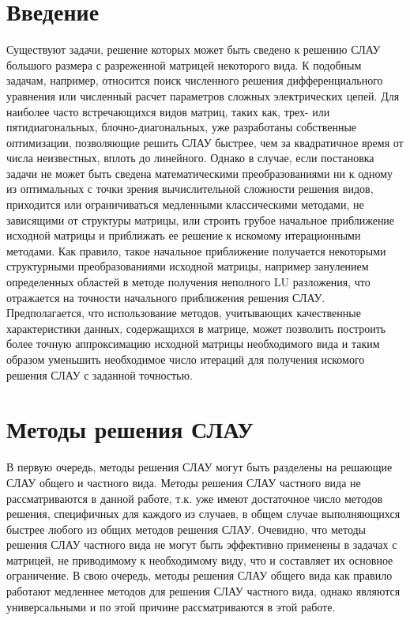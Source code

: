 
\renewcommand{\clearpage}{}


\section{Введение}
Существуют задачи, решение которых может быть сведено к решению СЛАУ большого размера с разреженной матрицей некоторого вида. К подобным задачам, например, относится поиск численного решения дифференциального уравнения или численный расчет параметров сложных электрических цепей. Для наиболее часто встречающихся видов матриц, таких как, трех- или пятидиагональных, блочно-диагональных, уже разработаны собственные оптимизации, позволяющие решить СЛАУ быстрее, чем за квадратичное время от числа неизвестных, вплоть до линейного. Однако в случае, если постановка задачи не может быть сведена математическими преобразованиями ни к одному из оптимальных с точки зрения вычислительной сложности решения видов, приходится или ограничиваться медленными классическими методами, не зависящими от структуры матрицы, или строить грубое начальное приближение исходной матрицы и приближать ее решение к искомому итерационными методами. Как правило, такое начальное приближение получается некоторыми структурными преобразованиями исходной матрицы, например занулением определенных областей в методе получения неполного LU разложения, что отражается на точности начального приближения решения СЛАУ. Предполагается, что использование методов, учитывающих качественные характеристики данных, содержащихся в матрице, может позволить построить более точную аппроксимацию исходной матрицы необходимого вида и таким образом уменьшить необходимое число итераций для получения искомого решения СЛАУ с заданной точностью.

\section{Методы решения СЛАУ}
В первую очередь, методы решения СЛАУ могут быть разделены на решающие СЛАУ общего и частного вида. Методы решения СЛАУ частного вида не рассматриваются в данной работе, т.к. уже имеют достаточное число методов решения, специфичных для каждого из случаев, в общем случае выполняющихся быстрее любого из общих методов решения СЛАУ. Очевидно, что методы решения СЛАУ частного вида не могут быть эффективно применены в задачах с матрицей, не приводимому к необходимому виду, что и составляет их основное ограничение. В свою очередь, методы решения СЛАУ общего вида как правило работают медленнее методов для решения СЛАУ частного вида, однако являются универсальными и по этой причине рассматриваются в этой работе.

